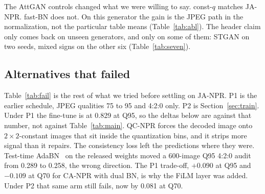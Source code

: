 \documentclass[conference]{IEEEtran}
\begin{document}
The AttGAN controls changed what we were willing to say. const-$q$ matches JA-NPR. fast-BN does not. On this generator the gain is the JPEG path in the normalization, not the particular table means (Table~\ref{tab:abl}). The header claim only comes back on unseen generators, and only on some of them: STGAN on two seeds, mixed signs on the other six (Table~\ref{tab:seven}).

\subsection{Alternatives that failed}
\label{sec:fail}
Table~\ref{tab:fail} is the rest of what we tried before settling on JA-NPR. P1 is the earlier schedule, JPEG qualities 75 to 95 and 4:2:0 only. P2 is Section~\ref{sec:train}. Under P1 the fine-tune is at 0.829 at Q95, so the deltas below are against that number, not against Table~\ref{tab:main}. QC-NPR forces the decoded image onto $2{\times}2$-constant images that sit inside the quantization bins, and it strips more signal than it repairs. The consistency loss left the predictions where they were. Test-time AdaBN~\cite{li2018adabn} on the released weights moved a 600-image Q95 4:2:0 audit from 0.289 to 0.258, the wrong direction. The P1 trade-off, $+0.090$ at Q95 and $-0.109$ at Q70 for CA-NPR with dual BN, is why the FiLM layer was added. Under P2 that same arm still fails, now by 0.081 at Q70.

\begin{table}[t]
\centering
\caption{Failed or partial alternatives (AttGAN, seed 0, AUC at Q95 4:2:0 unless noted).}
\label{tab:fail}
\setlength{\tabcolsep}{2pt}
\scriptsize
{}
\end{table}
\end{document}
